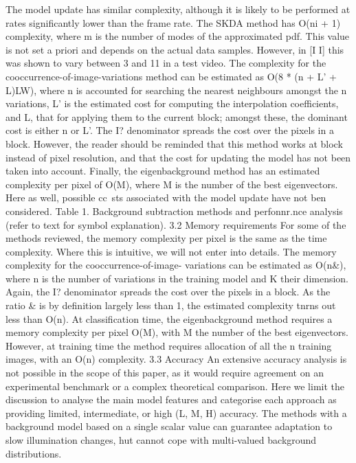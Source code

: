 The
model update has similar complexity,
although
it is
likely
to be
performed
at
rates
significantly
lower than the frame
rate.
The
SKDA method
has
O(ni
+
1)
complexity, where
m
is
the
number of modes
of
the
approximated
pdf.
This value
is
not
set
a
priori
and
depends on the actual data samples. However,
in
[I
I]
this
was shown
to
vary between
3
and
11
in
a
test
video.
The
complexity
for
the
cooccurrence-of-image-variations
method can be
estimated
as
O(8
*
(n
+
L'
+
L)LW),
where
n
is
accounted
for
searching the nearest neighbours
amongst
the
n
variations,
L'
is
the estimated cost
for
computing the interpolation
coefficients,
and
L,
that for
applying
them to
the current block; amongst
these,
the
dominant cost
is either
n
or
L'.
The
I?
denominator
spreads the cost
over
the pixels
in
a block. However,
the
reader should
be
reminded
that this
method works
at
block instead
of
pixel
resolution,
and
that
the
cost
for
updating the
model
has
not
been taken
into
account.
Finally,
the eigenbackground method
has an
estimated
complexity per pixel
of
O(M),
where
M
is
the
number
of
the best eigenvectors. Here
as
well, possible
cc~sts
associated with the model update have not
ben
considered.
Table
1.
Background subtraction methods and perfonnr.nce
analysis
(refer
to
text
for
symbol explanation).
3.2
Memory
requirements
For
some
of
the methods reviewed,
the
memory
complexity
per
pixel
is
the
same
as
the time complexity.
Where
this is intuitive,
we
will
not enter
into details.
The
memory
complexity
for
the cooccurrence-of-image-
variations can
be
estimated
as
O(n&),
where
n
is
the
number
of
variations
in
the
training
model and
K
their
dimension.
Again, the
I?
denominator spreads
the
cost
over
the pixels
in
a block. As the
ratio
&
is
by
definition
largely
less
than
1,
the estimated complexity
tnrns
out
less
than
O(n).
At
classification
time,
the
eigenbackground method requires a
memory
complexity
per pixel
O(M),
with
M
the number
of
the best
eigenvectors. However,
at
training
time the method
requires allocation of
all
the
n
training
images, with
an
O(n)
complexity.
3.3
Accuracy
An
extensive accuracy analysis
is
not
possible
in
the
scope of
this
paper,
as
it
would require agreement on
an
experimental benchmark
or
a complex
theoretical
comparison.
Here we
limit
the discussion
to
analyse the
main
model features
and
categorise
each
approach
as
providing
limited,
intermediate,
or
high
(L,
M,
H)
accuracy.
The methods with a background model based
on
a
single scalar
value can guarantee adaptation
to
slow
illumination changes,
hut
cannot cope
with
multi-valued
background
distributions.
